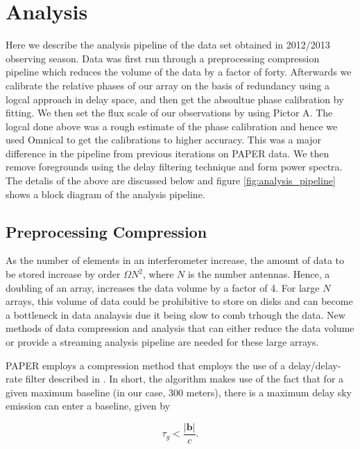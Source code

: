 \documentclass[twocolumn,numberedappendix]{emulateapj}
\begin{document}


\section{Analysis}
Here we describe the analysis pipeline of the data set obtained in 2012/2013
observing season. 
Data was first run through a preprocessing compression pipeline which reduces
the volume of the data by a factor of forty. Afterwards we calibrate the
relative phases of our array on the basis of redundancy using a logcal approach
in delay space, and then get the absoultue phase calibration by fitting. We then
set the flux scale of our observations by using Pictor A. The logcal done above
was a rough estimate of the phase calibration and hence we used Omnical to get
the calibrations to higher accuracy. This was a major difference in the pipeline
from previous iterations on PAPER data. We then remove foregrounds using the
delay filtering technique and form power spectra. The detalis of the above are
discussed below and figure \ref{fig:analysis_pipeline} shows a block diagram of
the analysis pipeline.

\subsection{Preprocessing Compression}
As the number of elements in an interferometer increase, the amount of data to
be stored increase by order $\Omega{N^{2}}$, where $N$ is the number antennas.
Hence, a doubling of an array, increases the data volume by a factor of 4. For
large $N$ arrays, this volume of data could be prohibitive to store on disks and
can become a bottleneck in data analaysis due it being slow to comb trhough the
data. New methods of data compression and analysis that can either
reduce the data volume or provide a streaming analysis pipeline are needed for
these large arrays. 

PAPER employs a compression method that employs the use of a delay/delay-rate
filter described in \cite{parsons_backer2009}. In short, the algorithm makes use
of the fact that for a given maximum baseline (in our case, 300 meters), there is
a maximum delay sky emission can enter a baseline, given by 

\begin{equation}
    \tau_{g} < \frac{|\mathbf{b}|}{c}.
\end{equation}
\end{document}
